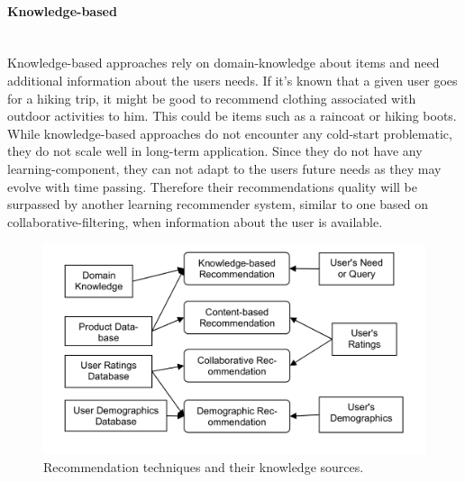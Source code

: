 \paragraph{Knowledge-based}\hfill\\
Knowledge-based approaches rely on domain-knowledge about items and need additional information about the users needs.
\citep[p.~12-13]{ricci:2011}
If it's known that a given user goes for a hiking trip, it might be good to recommend clothing associated with outdoor activities to him.
This could be items such as a raincoat or hiking boots.
\\
While knowledge-based approaches do not encounter any cold-start problematic, they do not scale well in long-term application.
Since they do not have any learning-component, they can not adapt to the users future needs as they may evolve with time passing.
Therefore their recommendations quality will be surpassed by another learning recommender system, similar to one based on collaborative-filtering, when information about the user is available.
\citep[p.~12-13]{ricci:2011}

\begin{figure}[h]
    \center
    \includegraphics[scale=0.3]{inc/recommendersystems/RecommendationTechniquesAndKnowledgeSources.png}
    \caption{Recommendation techniques and their knowledge sources.\citep[p.~379]{burke:2007}}
\end{figure}

